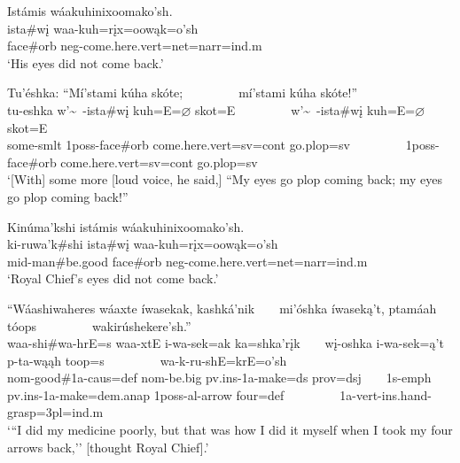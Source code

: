 \begin{exe}
\item\label{EJ71} \glll Istámis wáakuhinixoomako'sh.\\
ista\#wį waa-kuh=rįx=oowąk=o'sh\\
\textnormal{face}\#\textnormal{orb} neg-\textnormal{come.here}.vert=net=narr=ind.m\\
\glt `His eyes did not come back.'

\item\label{EJ72} \glll Tu'éshka: ``Mí'stami kúha skóte; ~ ~ ~ ~ ~ mí'stami kúha skóte!''\\
tu-eshka w'\~~-ista\#wį kuh=E=$\varnothing$ skot=E ~ ~ ~ ~ ~ w'\~~-ista\#wį kuh=E=$\varnothing$ skot=E\\
\textnormal{some}-smlt 1poss-\textnormal{face}\#\textnormal{orb} \textnormal{come.here}.vert=sv=cont \textnormal{go.plop}=sv ~ ~ ~ ~ ~ 1poss-\textnormal{face}\#\textnormal{orb} \textnormal{come.here}.vert=sv=cont \textnormal{go.plop}=sv\\
\glt `[With] some more [loud voice, he said,] ``My eyes go plop coming back; my eyes go plop coming back!''

\item\label{EJ73} \glll Kinúma'kshi istámis wáakuhinixoomako'sh.\\
ki-ruwa'k\#shi ista\#wį waa-kuh=rįx=oowąk=o'sh\\
mid-\textnormal{man}\#\textnormal{be.good} \textnormal{face}\#\textnormal{orb} neg-\textnormal{come.here}.vert=net=narr=ind.m\\
\glt `Royal Chief's eyes did not come back.'

\item\label{EJ74} \glll ``Wáashiwaheres wáaxte íwasekak, kashká'nik ~ ~ mi'óshka íwaseką't, ptamáah tóops ~ ~ ~ ~ ~ wakirúshekere'sh.''\\
waa-shi\#wa-hrE=s waa-xtE i-wa-sek=ak ka=shka'rįk ~ ~ wį-oshka i-wa-sek=ą't p-ta-wąąh toop=s ~ ~ ~ ~ ~ wa-k-ru-shE=krE=o'sh\\
nom-\textnormal{good}\#1a-caus=def nom-\textnormal{be.big} pv.ins-1a-\textnormal{make}=ds prov=dsj ~ ~ 1s-emph pv.ins-1a-\textnormal{make}=dem.anap 1poss-al-\textnormal{arrow} \textnormal{four}=def ~ ~ ~ ~ ~ 1a-vert-ins.hand-\textnormal{grasp}=3pl=ind.m\\
\glt `{``}I did my medicine poorly, but that was how I did it myself when I took my four arrows back,'' [thought Royal Chief].'


\end{exe}
